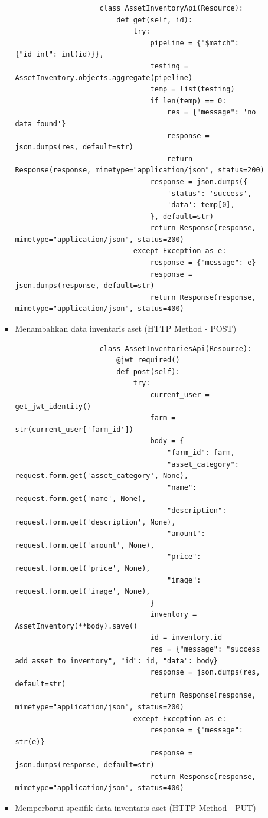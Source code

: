\begin{spacing}{1.5}
\begin{enumerate}
\begin{enumerate}
\begin{itemize}
				\begin{lstlisting}
					class AssetInventoryApi(Resource):
						def get(self, id):
							try:
								pipeline = {"$match": {"id_int": int(id)}},
								testing = AssetInventory.objects.aggregate(pipeline)
								temp = list(testing)
								if len(temp) == 0:
									res = {"message": 'no data found'}
									response = json.dumps(res, default=str)
									return Response(response, mimetype="application/json", status=200)
								response = json.dumps({
									'status': 'success',
									'data': temp[0],
								}, default=str)
								return Response(response, mimetype="application/json", status=200)
							except Exception as e:
								response = {"message": e}
								response = json.dumps(response, default=str)
								return Response(response, mimetype="application/json", status=400)
				\end{lstlisting}

				\item Menambahkan data inventaris aset (HTTP Method - POST)
				
				\begin{lstlisting}
					class AssetInventoriesApi(Resource):
						@jwt_required()
						def post(self):
							try:
								current_user = get_jwt_identity()
								farm = str(current_user['farm_id'])
								body = {
									"farm_id": farm,
									"asset_category": request.form.get('asset_category', None),
									"name": request.form.get('name', None),
									"description": request.form.get('description', None),
									"amount": request.form.get('amount', None),
									"price": request.form.get('price', None),
									"image": request.form.get('image', None),
								}
								inventory = AssetInventory(**body).save()
								id = inventory.id
								res = {"message": "success add asset to inventory", "id": id, "data": body}
								response = json.dumps(res, default=str)
								return Response(response, mimetype="application/json", status=200)
							except Exception as e:
								response = {"message": str(e)}
								response = json.dumps(response, default=str)
								return Response(response, mimetype="application/json", status=400)
				\end{lstlisting}

				\item Memperbarui spesifik data inventaris aset (HTTP Method - PUT)
				

\end{itemize}
\end{enumerate}
\end{enumerate}
\end{spacing}
